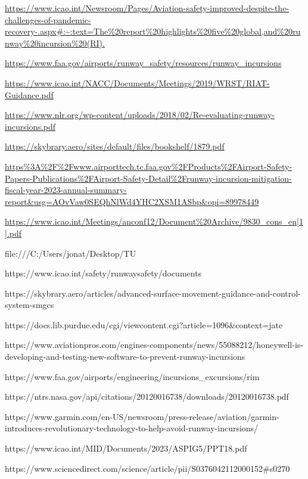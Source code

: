 \url{https://www.icao.int/Newsroom/Pages/Aviation-safety-improved-despite-the-challenges-of-pandemic-recovery-.aspx#:~:text=The%20report%20highlights%20five%20global,and%20runway%20incursion%20(RI).}

\newline \url{https://www.faa.gov/airports/runway_safety/resources/runway_incursions}

\newline \url{https://www.icao.int/NACC/Documents/Meetings/2019/WRST/RIAT-Guidance.pdf}

\newline \url{https://www.nlr.org/wp-content/uploads/2018/02/Re-evaluating-runway-
incursions.pdf}

\newline \url{https://skybrary.aero/sites/default/files/bookshelf/1879.pdf}

\url{https%3A%2F%2Fwww.airporttech.tc.faa.gov%2FProducts%2FAirport-Safety-Papers-Publications%2FAirport-Safety-Detail%2Frunway-incursion-mitigation-fiscal-year-2023-annual-summary-report&usg=AOvVaw0SEQhNlWd4YHC2XSM1ASbp&opi=89978449}

\url{https://www.icao.int/Meetings/anconf12/Document%20Archive/9830_cons_en[1].pdf}

file:///C:/Users/jonat/Desktop/TU%

https://www.icao.int/safety/runwaysafety/documents%

https://skybrary.aero/articles/advanced-surface-movement-guidance-and-control-system-smgcs

https://docs.lib.purdue.edu/cgi/viewcontent.cgi?article=1096&context=jate

https://www.aviationpros.com/engines-components/news/55088212/honeywell-is-developing-and-testing-new-software-to-prevent-runway-incursions

https://www.faa.gov/airports/engineering/incursions_excursions/rim

https://ntrs.nasa.gov/api/citations/20120016738/downloads/20120016738.pdf

https://www.garmin.com/en-US/newsroom/press-release/aviation/garmin-introduces-revolutionary-technology-to-help-avoid-runway-incursions/

https://www.icao.int/MID/Documents/2023/ASPIG5/PPT18.pdf

https://www.sciencedirect.com/science/article/pii/S0376042112000152#s0270

